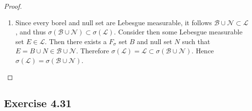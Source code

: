 \documentclass[hw_all.tex]{subfiles}
\begin{document}
\begin{proof}
\begin{enumerate}
        \item 
            Since every borel and null set are Lebesgue measurable, it follows $\mathcal{B} \cup \mathcal{N} \subset \mathcal{L}$, and thus $\sigma(\mathcal{B} \cup \mathcal{N}) \subset \sigma(\mathcal{L})$. Consider then some Lebesgue measurable set $E \in \mathcal{L}$. Then there exists a $F_{\sigma}$ set $B$ and null set $N$ such that $E = B \cup N \in \mathcal{B} \cup \mathcal{N}$. Therefore $\sigma(\mathcal{L}) = \mathcal{L} \subset \sigma(\mathcal{B} \cup \mathcal{N})$. Hence $\sigma(\mathcal{L}) = \sigma(\mathcal{B} \cup \mathcal{N})$.
    \end{enumerate}
\end{proof}

\subsection{Exercise 4.31}
\end{document}
